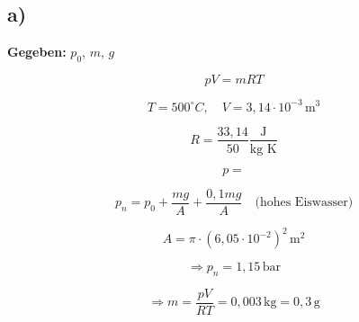 

\subsection*{a)}
\textbf{Gegeben:} $p_0$, $m$, $g$

\[
p V = m R T
\]

\[
T = 500^\circ C, \quad V = 3,14 \cdot 10^{-3} \, \text{m}^3
\]

\[
R = \frac{33,14}{50} \frac{\text{J}}{\text{kg K}}
\]

\[
p = 
\]

\[
p_n = p_0 + \frac{m g}{A} + \frac{0,1 m g}{A} \quad \text{(hohes Eiswasser)}
\]

\[
A = \pi \cdot (6,05 \cdot 10^{-2})^2 \, \text{m}^2
\]

\[
\Rightarrow p_n = 1,15 \, \text{bar}
\]

\[
\Rightarrow m = \frac{p V}{R T} = 0,003 \, \text{kg} = \boxed{0,3 \, \text{g}}
\]